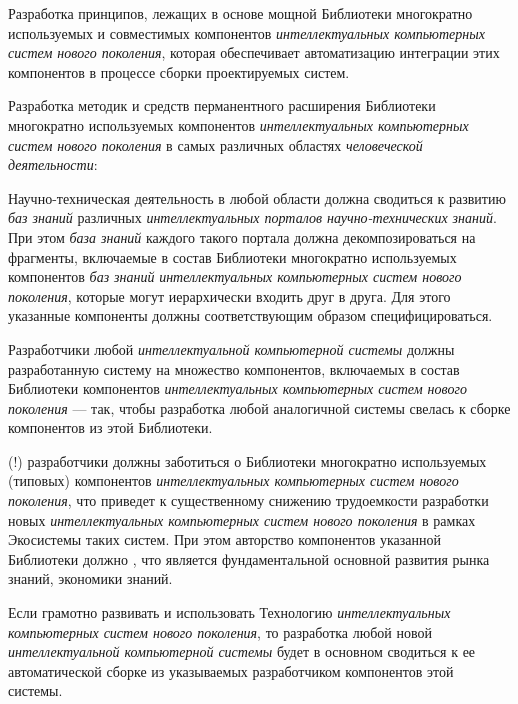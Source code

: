 \begin{textitemize}
	\item Разработка принципов, лежащих в основе мощной Библиотеки многократно используемых и совместимых компонентов \textit{интеллектуальных компьютерных систем нового поколения}, которая обеспечивает  автоматизацию интеграции этих компонентов в процессе сборки проектируемых систем.
	\item Разработка методик и средств перманентного расширения Библиотеки многократно используемых компонентов \textit{интеллектуальных компьютерных систем нового поколения} в самых различных областях \textit{человеческой деятельности}:
	\begin{textitemize}
		\item Научно-техническая деятельность в любой области должна сводиться к развитию \textit{баз знаний} различных \textit{интеллектуальных порталов научно-технических знаний}. При этом \textit{база знаний} каждого такого портала должна декомпозироваться на фрагменты, включаемые в состав Библиотеки многократно используемых компонентов \textit{баз знаний} \textit{интеллектуальных компьютерных систем нового поколения}, которые могут иерархически входить друг в друга. Для этого указанные компоненты должны соответствующим образом специфицироваться.
		\item Разработчики любой \textit{интеллектуальной компьютерной системы} должны  разработанную систему на множество компонентов, включаемых в состав Библиотеки компонентов\textit{ интеллектуальных компьютерных систем нового поколения} --- так, чтобы разработка любой аналогичной системы свелась к сборке компонентов из этой Библиотеки.
		\item {}(!) разработчики должны заботиться о  Библиотеки многократно используемых (типовых) компонентов \textit{интеллектуальных компьютерных систем нового поколения}, что приведет к существенному снижению трудоемкости разработки новых \textit{интеллектуальных компьютерных систем нового поколения} в рамках Экосистемы таких систем. При этом авторство компонентов  указанной Библиотеки должно , что является фундаментальной основной развития рынка знаний, экономики знаний. 
		
		Если грамотно развивать и использовать Технологию \textit{интеллектуальных компьютерных систем нового поколения}, то разработка любой новой \textit{интеллектуальной компьютерной системы} будет в основном сводиться к ее автоматической сборке из указываемых разработчиком компонентов этой системы.
	\end{textitemize}
\end{textitemize}

